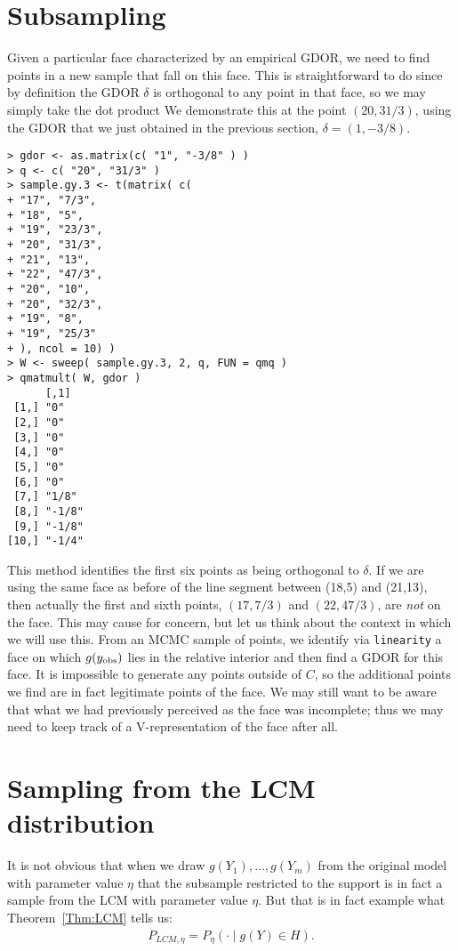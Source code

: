 \section{Subsampling}
Given a particular face characterized by an empirical GDOR, we need to
find points in a new sample that fall on this face.  This is straightforward to
do since by definition the GDOR $\delta$ is orthogonal to any point in that face,
so we may simply take the dot product 
We demonstrate this at the point $(20, 31/3)$, using the GDOR that we just 
obtained in the previous section, $\delta = (1, -3/8)$.
\begin{verbatim}
> gdor <- as.matrix(c( "1", "-3/8" ) )
> q <- c( "20", "31/3" )
> sample.gy.3 <- t(matrix( c(
+ "17", "7/3",
+ "18", "5",
+ "19", "23/3",
+ "20", "31/3",
+ "21", "13",
+ "22", "47/3",
+ "20", "10",
+ "20", "32/3",
+ "19", "8",
+ "19", "25/3"
+ ), ncol = 10) )
> W <- sweep( sample.gy.3, 2, q, FUN = qmq )
> qmatmult( W, gdor )
      [,1]  
 [1,] "0"   
 [2,] "0"   
 [3,] "0"   
 [4,] "0"   
 [5,] "0"   
 [6,] "0"   
 [7,] "1/8" 
 [8,] "-1/8"
 [9,] "-1/8"
[10,] "-1/4"
\end{verbatim}
This method identifies the first six points as being orthogonal to $\delta$.
If we are using the same face as before of the line segment between (18,5) and (21,13), then actually the first and sixth points, $(17, 7/3)$ and $(22,47/3)$, 
are \emph{not} on the face.  This may cause for concern, but let us 
think about the context in which we will use this.  From an MCMC sample of points,
we identify via \texttt{linearity} a face on which $g(y_{\text{obs}})$ lies in the relative
interior and then find a GDOR for this face.  It is impossible to generate any
points outside of $C$, so the additional points we find are in fact legitimate 
points of the face.  We may still want to be aware that what we had previously
perceived as the face was incomplete; thus we may need to keep track of a 
V-representation of the face after all.

\section{Sampling from the LCM distribution}
It is not obvious that when we draw $g(Y_1), \ldots, g(Y_m)$ from the 
original model with parameter value $\eta$ that the subsample restricted to the 
support is in fact a sample from the LCM with parameter value $\eta$.  
But that is in fact example what Theorem~\ref{Thm:LCM} tells us: 
\begin{align*}
P_{LCM, \eta} = P_\eta( \cdot \mid g(Y) \in H ).
\end{align*}


